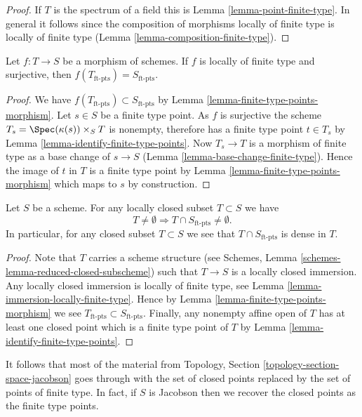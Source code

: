 \begin{proof}
If $T$ is the spectrum of a field this is Lemma \ref{lemma-point-finite-type}.
In general it follows since the composition of morphisms locally of finite
type is locally of finite type (Lemma \ref{lemma-composition-finite-type}).
\end{proof}

\begin{lemma}
\label{lemma-finite-type-points-surjective-morphism}
Let $f : T \to S$ be a morphism of schemes.
If $f$ is locally of finite type and surjective, then
$f(T_{\text{ft-pts}}) = S_{\text{ft-pts}}$.
\end{lemma}

\begin{proof}
We have $f(T_{\text{ft-pts}}) \subset S_{\text{ft-pts}}$ by
Lemma \ref{lemma-finite-type-points-morphism}.
Let $s \in S$ be a finite type point. As $f$ is surjective the scheme
$T_s = \Spec(\kappa(s)) \times_S T$ is nonempty, therefore
has a finite type point $t \in T_s$ by
Lemma \ref{lemma-identify-finite-type-points}.
Now $T_s \to T$ is a morphism of finite type as a base change
of $s \to S$
(Lemma \ref{lemma-base-change-finite-type}).
Hence the image of $t$ in $T$ is a finite type point by
Lemma \ref{lemma-finite-type-points-morphism}
which maps to $s$ by construction.
\end{proof}

\begin{lemma}
\label{lemma-enough-finite-type-points}
Let $S$ be a scheme.
For any locally closed subset $T \subset S$ we have
$$
T \not = \emptyset
\Rightarrow
T \cap S_{\text{ft-pts}} \not = \emptyset.
$$
In particular, for any closed subset $T \subset S$ we
see that $T \cap S_{\text{ft-pts}}$ is dense in $T$.
\end{lemma}

\begin{proof}
Note that $T$ carries a scheme structure (see
Schemes, Lemma \ref{schemes-lemma-reduced-closed-subscheme})
such that $T \to S$ is a locally closed immersion.
Any locally closed immersion is locally of finite type,
see Lemma \ref{lemma-immersion-locally-finite-type}.
Hence by Lemma \ref{lemma-finite-type-points-morphism}
we see $T_{\text{ft-pts}} \subset S_{\text{ft-pts}}$.
Finally, any nonempty affine open of $T$ has at least one closed point
which is a finite type point of $T$ by
Lemma \ref{lemma-identify-finite-type-points}.
\end{proof}

\noindent
It follows that most of the material from
Topology, Section \ref{topology-section-space-jacobson} goes through
with the set of closed points replaced by the set of points of
finite type.
In fact, if $S$ is Jacobson then we recover the closed points as
the finite type points.

